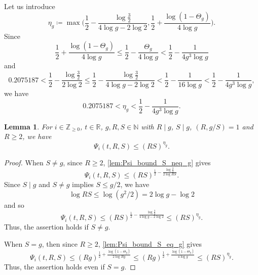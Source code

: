 \documentclass[hidelinks]{amsart}
\numberwithin{equation}{section}
\theoremstyle{plain}
\newtheorem{lemma}{Lemma}
\theoremstyle{definition}
\begin{document}
Let us introduce
\begin{equation}
\label{def:eta}
\eta_{g}
\coloneqq
\max\biggl(
\frac{1}{2}-\frac{\log\frac{3}{2}}{4\log g-2\log 2},
\frac{1}{2}+\frac{\log(1-\Theta_{g})}{4\log g}
\biggr).
\end{equation}
Since
\[
\frac{1}{2}+\frac{\log(1-\Theta_{g})}{4\log g}
\le
\frac{1}{2}-\frac{\Theta_{g}}{4\log g}
<
\frac{1}{2}-\frac{1}{4g^{3}\log g}
\]
and
\[
0.2075187
<
\frac{1}{2}-\frac{\log\frac{3}{2}}{2\log 2}
\le
\frac{1}{2}-\frac{\log\frac{3}{2}}{4\log g-2\log 2}
<
\frac{1}{2}-\frac{1}{16\log g}
<
\frac{1}{2}-\frac{1}{4g^{3}\log g},
\]
we have
\begin{equation}
\label{eta_bound}
0.2075187
<
\eta_{g}
<
\frac{1}{2}-\frac{1}{4g^{3}\log g}.
\end{equation}

\begin{lemma}
\label{lem:Psi_bound}
For $i\in\mathbb{Z}_{\ge0}$, $t\in\mathbb{R}$, $g,R,S\in\mathbb{N}$ with $R\mid g$, $S\mid g$,
$(R,g/S)=1$ and $R\ge2$, we have
\[
\Psi_{i}(t,R,S)
\le
(RS)^{\eta_{g}}.
\]
\end{lemma}
\begin{proof}
When $S\neq g$, since $R\ge2$, \cref{lem:Psi_bound_S_neq_g} gives
\[
\Psi_{i}(t,R,S)
\le
(RS)^{\frac{1}{2}-\frac{\log\frac{3}{2}}{2\log RS}}.
\]
Since $S\mid g$ and $S\neq g$ implies $S\le g/2$, we have
\[
\log RS\le\log (g^{2}/2)=2\log g-\log 2
\]
and so
\[
\Psi_{i}(t,R,S)
\le
(RS)^{\frac{1}{2}-\frac{\log\frac{3}{2}}{4\log g-2\log 2}}
\le
(RS)^{\eta_{g}}.
\]
Thus, the assertion holds if $S\neq g$.

When $S=g$, then since $R\ge2$, \cref{lem:Psi_bound_S_eq_g} gives
\[
\Psi_{i}(t,R,S)
\le
(Rg)^{\frac{1}{2}+\frac{\log(1-\Theta_{g})}{2\log Rg}}
\le
(Rg)^{\frac{1}{2}+\frac{\log(1-\Theta_{g})}{4\log g}}
\le
(RS)^{\eta_{g}}.
\]
Thus, the assertion holds even if $S=g$.
\end{proof}
\end{document}
